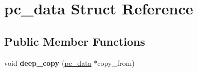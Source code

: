 \hypertarget{structpc__data}{\section{pc\-\_\-data Struct Reference}
\label{structpc__data}
}
\subsection*{Public Member Functions}
\begin{DoxyCompactItemize}
\item 
\hypertarget{structpc__data_a4ac95ef485c0f399dc8cea0182f297f0}{void {\bfseries deep\-\_\-copy} (\hyperlink{structpc__data}{pc\-\_\-data} $\ast$copy\-\_\-from)}\label{structpc__data_a4ac95ef485c0f399dc8cea0182f297f0}

\end{DoxyCompactItemize}

